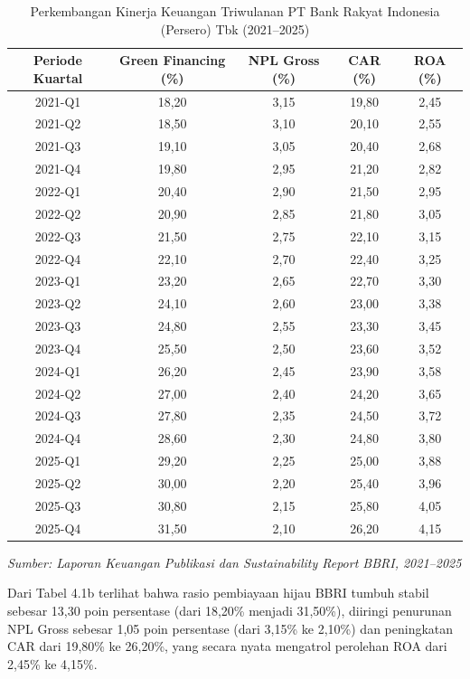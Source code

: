 \documentclass[12pt,a4paper]{article}
\numberwithin{equation}{section}
\begin{document}
\begin{table}[H]
  \caption{Perkembangan Kinerja Keuangan Triwulanan PT Bank Rakyat Indonesia (Persero) Tbk (2021--2025)}
  \label{tab:kinerja_bbri}
  \small
  \begin{tabularx}{\textwidth}{|c|c|c|c|c|}
    \hline
    \textbf{Periode Kuartal} & \textbf{Green Financing (\%)} & \textbf{NPL Gross (\%)} & \textbf{CAR (\%)} & \textbf{ROA (\%)} \\
    \hline
    2021-Q1 & 18,20 & 3,15 & 19,80 & 2,45 \\
    2021-Q2 & 18,50 & 3,10 & 20,10 & 2,55 \\
    2021-Q3 & 19,10 & 3,05 & 20,40 & 2,68 \\
    2021-Q4 & 19,80 & 2,95 & 21,20 & 2,82 \\
    \hline
    2022-Q1 & 20,40 & 2,90 & 21,50 & 2,95 \\
    2022-Q2 & 20,90 & 2,85 & 21,80 & 3,05 \\
    2022-Q3 & 21,50 & 2,75 & 22,10 & 3,15 \\
    2022-Q4 & 22,10 & 2,70 & 22,40 & 3,25 \\
    \hline
    2023-Q1 & 23,20 & 2,65 & 22,70 & 3,30 \\
    2023-Q2 & 24,10 & 2,60 & 23,00 & 3,38 \\
    2023-Q3 & 24,80 & 2,55 & 23,30 & 3,45 \\
    2023-Q4 & 25,50 & 2,50 & 23,60 & 3,52 \\
    \hline
    2024-Q1 & 26,20 & 2,45 & 23,90 & 3,58 \\
    2024-Q2 & 27,00 & 2,40 & 24,20 & 3,65 \\
    2024-Q3 & 27,80 & 2,35 & 24,50 & 3,72 \\
    2024-Q4 & 28,60 & 2,30 & 24,80 & 3,80 \\
    \hline
    2025-Q1 & 29,20 & 2,25 & 25,00 & 3,88 \\
    2025-Q2 & 30,00 & 2,20 & 25,40 & 3,96 \\
    2025-Q3 & 30,80 & 2,15 & 25,80 & 4,05 \\
    2025-Q4 & 31,50 & 2,10 & 26,20 & 4,15 \\
    \hline
  \end{tabularx}
  \begin{flushleft}
    \textit{Sumber: Laporan Keuangan Publikasi dan Sustainability Report BBRI, 2021--2025}
  \end{flushleft}
\end{table}

\noindent
Dari Tabel 4.1b terlihat bahwa rasio pembiayaan hijau BBRI tumbuh stabil sebesar 13,30 poin persentase (dari 18,20\% menjadi 31,50\%), diiringi penurunan NPL Gross sebesar 1,05 poin persentase (dari 3,15\% ke 2,10\%) dan peningkatan CAR dari 19,80\% ke 26,20\%, yang secara nyata mengatrol perolehan ROA dari 2,45\% ke 4,15\%.
\end{document}
